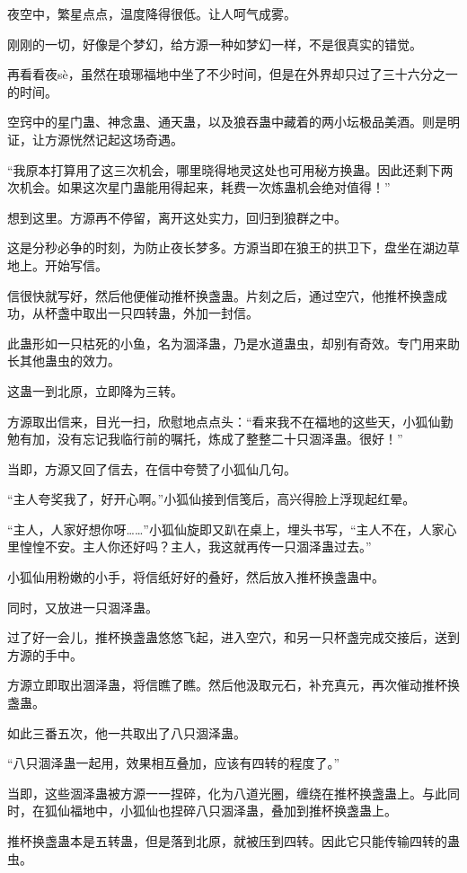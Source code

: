 \begin{this_body}
夜空中，繁星点点，温度降得很低。让人呵气成雾。

刚刚的一切，好像是个梦幻，给方源一种如梦幻一样，不是很真实的错觉。

再看看夜sè，虽然在琅琊福地中坐了不少时间，但是在外界却只过了三十六分之一的时间。

空窍中的星门蛊、神念蛊、通天蛊，以及狼吞蛊中藏着的两小坛极品美酒。则是明证，让方源恍然记起这场奇遇。

“我原本打算用了这三次机会，哪里晓得地灵这处也可用秘方换蛊。因此还剩下两次机会。如果这次星门蛊能用得起来，耗费一次炼蛊机会绝对值得！”

想到这里。方源再不停留，离开这处实力，回归到狼群之中。

这是分秒必争的时刻，为防止夜长梦多。方源当即在狼王的拱卫下，盘坐在湖边草地上。开始写信。

信很快就写好，然后他便催动推杯换盏蛊。片刻之后，通过空穴，他推杯换盏成功，从杯盏中取出一只四转蛊，外加一封信。

此蛊形如一只枯死的小鱼，名为涸泽蛊，乃是水道蛊虫，却别有奇效。专门用来助长其他蛊虫的效力。

这蛊一到北原，立即降为三转。

方源取出信来，目光一扫，欣慰地点点头：“看来我不在福地的这些天，小狐仙勤勉有加，没有忘记我临行前的嘱托，炼成了整整二十只涸泽蛊。很好！”

当即，方源又回了信去，在信中夸赞了小狐仙几句。

“主人夸奖我了，好开心啊。”小狐仙接到信笺后，高兴得脸上浮现起红晕。

“主人，人家好想你呀……”小狐仙旋即又趴在桌上，埋头书写，“主人不在，人家心里惶惶不安。主人你还好吗？主人，我这就再传一只涸泽蛊过去。”

小狐仙用粉嫩的小手，将信纸好好的叠好，然后放入推杯换盏蛊中。

同时，又放进一只涸泽蛊。

过了好一会儿，推杯换盏蛊悠悠飞起，进入空穴，和另一只杯盏完成交接后，送到方源的手中。

方源立即取出涸泽蛊，将信瞧了瞧。然后他汲取元石，补充真元，再次催动推杯换盏蛊。

如此三番五次，他一共取出了八只涸泽蛊。

“八只涸泽蛊一起用，效果相互叠加，应该有四转的程度了。”

当即，这些涸泽蛊被方源一一捏碎，化为八道光圈，缠绕在推杯换盏蛊上。与此同时，在狐仙福地中，小狐仙也捏碎八只涸泽蛊，叠加到推杯换盏蛊上。

推杯换盏蛊本是五转蛊，但是落到北原，就被压到四转。因此它只能传输四转的蛊虫。


\end{this_body}
